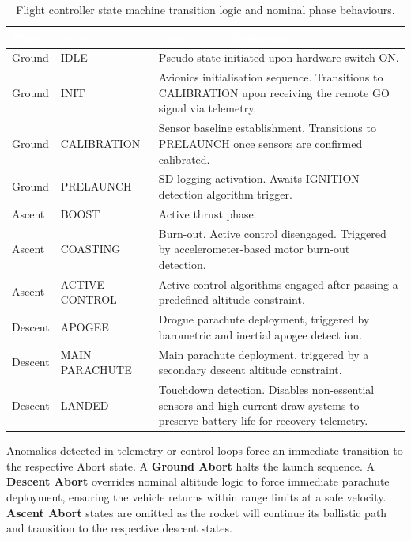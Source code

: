 \documentclass[11pt,a4paper]{article}
\begin{document}
\begin{table}[H]
    \centering
    \caption{Flight controller state machine transition logic and nominal phase behaviours.}
    \label{tab:conops_states}
    \begin{tabularx}{\textwidth}{|l|l|X|}
        \hline
        \rowcolor{EtseNavy}
        \textbf{\textcolor{white}{Phase}} & \textbf{\textcolor{white}{State}} & \textbf{\textcolor{white}{Condition \& Behaviour}} \\ \hline
        Ground & IDLE & Pseudo-state initiated upon hardware switch ON. \\ \hline
        \rowcolor{LightGrayTable}
        Ground & INIT & Avionics initialisation sequence. Transitions to CALIBRATION upon receiving the remote GO signal via telemetry. \\ \hline
        Ground & CALIBRATION & Sensor baseline establishment. Transitions to PRELAUNCH once sensors are confirmed calibrated. \\ \hline
        \rowcolor{LightGrayTable}
        Ground & PRELAUNCH & SD logging activation. Awaits IGNITION detection algorithm trigger. \\ \hline
        Ascent & BOOST & Active thrust phase. \\ \hline
        \rowcolor{LightGrayTable}
        Ascent & COASTING & Burn-out. Active control disengaged. Triggered by accelerometer-based motor burn-out detection. \\ \hline
        Ascent & ACTIVE CONTROL & Active control algorithms engaged after passing a predefined altitude constraint. \\ \hline
        \rowcolor{LightGrayTable}
        Descent & APOGEE & Drogue parachute deployment, triggered by barometric and inertial apogee detect  ion. \\ \hline
        Descent & MAIN PARACHUTE & Main parachute deployment, triggered by a secondary descent altitude constraint. \\ \hline
        \rowcolor{LightGrayTable}
        Descent & LANDED & Touchdown detection. Disables non-essential sensors and high-current draw systems to preserve battery life for recovery telemetry. \\ \hline
    \end{tabularx}
\end{table}

Anomalies detected in telemetry or control loops force an immediate transition to the respective Abort state. A \textbf{Ground Abort} halts the launch sequence. A \textbf{Descent Abort} overrides nominal altitude logic to force immediate parachute deployment, ensuring the vehicle returns within range limits at a safe velocity.
\textbf{Ascent Abort} states are omitted as the rocket will continue its ballistic path and transition to the respective descent states.
\end{document}

